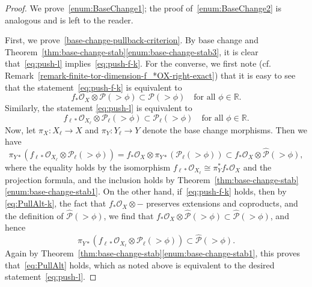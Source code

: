 \documentclass[11pt, reqno]{amsart}
\numberwithin{equation}{section}
\theoremstyle{plain}
\theoremstyle{remark}
\theoremstyle{definition}
\theoremstyle{italicsname}
\newcommand{\cO}{\mathcal{O}}
\newcommand{\cP}{\mathscr{P}}
\def\RR{\ensuremath{\mathbb{R}}}
\begin{document}
\begin{proof}
We prove~\ref{enum:BaseChange1}; the proof of~\ref{enum:BaseChange2} is analogous and is left to the reader. 

First, we prove~\ref{base-change-pullback-criterion}. 
By base change and Theorem~\ref{thm:base-change-stab}\ref{enum:base-change-stab3}, it is clear that~\eqref{eq:push-l} implies~\eqref{eq:push-f-k}.
For the converse, we first note (cf. Remark~\ref{remark-finite-tor-dimension-f_*OX-right-exact}) that it is easy to see that the statement~\eqref{eq:push-f-k} is equivalent to 
\begin{equation}\label{eq:PullAlt-k}
f_*\cO_{X} \otimes \cP(>\phi) \subset \cP(> \phi) \quad \text{for all } \phi \in \RR. 
\end{equation}
Similarly, the statement \eqref{eq:push-l} is equivalent to
\begin{equation}\label{eq:PullAlt}
f_{\ell*}\cO_{X_{\ell}} \otimes \cP_{\ell}(>\phi) \subset \cP_{\ell}(> \phi) \quad \text{for all } \phi \in \RR. 
\end{equation}
Now, let $\pi_X\colon X_{\ell}\to X$ and $\pi_Y\colon Y_{\ell}\to Y$ denote the base change morphisms.
Then we have 
\begin{equation*}
    \pi_{Y*}(f_{\ell*}\cO_{X_{\ell}} \otimes \cP_{\ell}(>\phi)) 
    = f_*\cO_X \otimes \pi_{Y*}(\cP_{\ell}(> \phi)) \subset 
    f_*\cO_X \otimes \widehat{\cP}(> \phi), 
\end{equation*}
where the equality holds by the isomorphism $f_{\ell*}\cO_{X_{\ell}} \cong \pi_Y^*f_*\cO_X$ and the projection formula, and the inclusion holds by Theorem~\ref{thm:base-change-stab}\ref{enum:base-change-stab1}. 
On the other hand, if~\eqref{eq:push-f-k} holds, then by \eqref{eq:PullAlt-k}, the fact that $f_*\cO_X \otimes -$ preserves extensions and coproducts, and the definition of $\widehat{\cP}(> \phi)$, we find that 
$f_*\cO_X \otimes \widehat{\cP}(> \phi) \subset \widehat{\cP}(> \phi)$, and hence
\begin{equation*}
 \pi_{Y*}(f_{\ell*}\cO_{X_{\ell}} \otimes \cP_{\ell}(>\phi)) \subset \widehat{\cP}(> \phi). 
\end{equation*} 
Again by Theorem~\ref{thm:base-change-stab}\ref{enum:base-change-stab1}, this proves that~\eqref{eq:PullAlt} holds, which as noted above is equivalent to the desired statement~\eqref{eq:push-l}. 


\end{proof}
\end{document}
